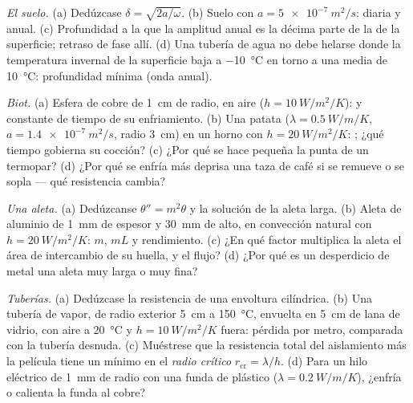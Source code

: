 \begin{exercise}[$\star\star$]\label{exo:b2:heat-conduction:6}
\emph{El suelo.} (a) Dedúzcase $\delta = \sqrt{2a/\omega}$. (b) Suelo con
$a = \qty{5e-7}{m^2/s}$:  diaria y anual. (c) Profundidad
a la que la amplitud anual es la décima parte de la de la superficie; retraso de fase
allí. (d) Una tubería de agua no debe helarse donde la temperatura invernal de la superficie
baja a \qty{-10}{\celsius} en torno a una media de
\qty{10}{\celsius}: profundidad mínima (onda anual).
\end{exercise}

\begin{exercise}[$\star\star$]\label{exo:b2:heat-conduction:7}
\emph{Biot.} (a) Esfera de cobre de \qty{1}{cm} de radio, en aire ($h =
\qty{10}{W/m^2/K}$):  y constante de tiempo de su enfriamiento. (b) Una
patata ($\lambda = \qty{0.5}{W/m/K}$, $a = \qty{1.4e-7}{m^2/s}$, radio
\qty{3}{cm}) en un horno con $h = \qty{20}{W/m^2/K}$: ; ¿qué
tiempo gobierna su cocción? (c) ¿Por qué se hace pequeña la punta de un termopar?
(d) ¿Por qué se enfría más deprisa una taza de café si se remueve o se sopla ---
qué resistencia cambia?
\end{exercise}

\begin{exercise}[$\star\star$]\label{exo:b2:heat-conduction:8}
\emph{Una aleta.} (a) Dedúzcanse $\theta'' = m^2\theta$ y la solución de la aleta larga.
(b) Aleta de aluminio de \qty{1}{mm} de espesor y \qty{30}{mm} de alto, en convección
natural con $h = \qty{20}{W/m^2/K}$: $m$, $mL$ y rendimiento. (c) ¿En qué
factor multiplica la aleta el área de intercambio de su huella, y
el flujo? (d) ¿Por qué es un desperdicio de metal una aleta muy larga o muy fina?
\end{exercise}

\begin{exercise}[$\star\star$]\label{exo:b2:heat-conduction:9}
\emph{Tuberías.} (a) Dedúzcase la resistencia de una envoltura cilíndrica. (b) Una
tubería de vapor, de radio exterior \qty{5}{cm} a \qty{150}{\celsius}, envuelta en
\qty{5}{cm} de lana de vidrio, con aire a \qty{20}{\celsius} y $h =
\qty{10}{W/m^2/K}$ fuera: pérdida por metro, comparada con la tubería desnuda.
(c) Muéstrese que la resistencia total del aislamiento más la película tiene un
mínimo en el \emph{radio crítico} $r_{\text{cr}} = \lambda/h$. (d) Para un
hilo eléctrico de \qty{1}{mm} de radio con una funda de plástico ($\lambda =
\qty{0.2}{W/m/K}$), ¿enfría o calienta la funda al cobre?
\end{exercise}

